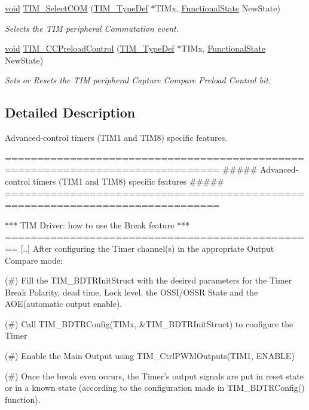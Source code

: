 \begin{DoxyCompactItemize}
\hyperlink{group___n_a_m_e_ga18028b8badbf1ea7e704ccac3c488e82}{void} \hyperlink{group___t_i_m___group4_gaff2e7f9959b1b36e830df028c14accc8}{T\-I\-M\-\_\-\-Select\-C\-O\-M} (\hyperlink{struct_t_i_m___type_def}{T\-I\-M\-\_\-\-Type\-Def} $\ast$T\-I\-Mx, \hyperlink{group___exported__types_gac9a7e9a35d2513ec15c3b537aaa4fba1}{Functional\-State} New\-State)
\begin{DoxyCompactList}\small\item\em Selects the T\-I\-M peripheral Commutation event. \end{DoxyCompactList}\item 
\hyperlink{group___n_a_m_e_ga18028b8badbf1ea7e704ccac3c488e82}{void} \hyperlink{group___t_i_m___group4_ga0a935254e44312b1d78e8684a58db3c1}{T\-I\-M\-\_\-\-C\-C\-Preload\-Control} (\hyperlink{struct_t_i_m___type_def}{T\-I\-M\-\_\-\-Type\-Def} $\ast$T\-I\-Mx, \hyperlink{group___exported__types_gac9a7e9a35d2513ec15c3b537aaa4fba1}{Functional\-State} New\-State)
\begin{DoxyCompactList}\small\item\em Sets or Resets the T\-I\-M peripheral Capture Compare Preload Control bit. \end{DoxyCompactList}\end{DoxyCompactItemize}


\subsection{Detailed Description}
Advanced-\/control timers (T\-I\-M1 and T\-I\-M8) specific features. \begin{DoxyVerb} ===============================================================================
     ##### Advanced-control timers (TIM1 and TIM8) specific features #####
 ===============================================================================  
       
  *** TIM Driver: how to use the Break feature ***
  ================================================ 
  [..]
  After configuring the Timer channel(s) in the appropriate Output Compare mode: 
                         
       (#) Fill the TIM_BDTRInitStruct with the desired parameters for the Timer
           Break Polarity, dead time, Lock level, the OSSI/OSSR State and the 
           AOE(automatic output enable).
               
       (#) Call TIM_BDTRConfig(TIMx, &TIM_BDTRInitStruct) to configure the Timer
          
       (#) Enable the Main Output using TIM_CtrlPWMOutputs(TIM1, ENABLE) 
          
       (#) Once the break even occurs, the Timer's output signals are put in reset
           state or in a known state (according to the configuration made in
           TIM_BDTRConfig() function).\end{DoxyVerb}


